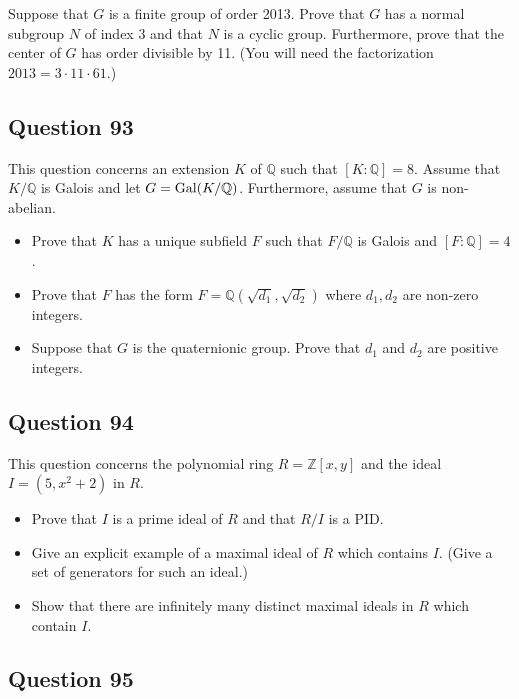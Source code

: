 \documentclass[12pt]{article}
\begin{document}
Suppose that \(G\) is a finite group of order 2013. Prove that \(G\) has
a normal subgroup \(N\) of index 3 and that \(N\) is a cyclic group.
Furthermore, prove that the center of \(G\) has order divisible by 11.
(You will need the factorization \(2013=3\cdot11\cdot61\).)

\hypertarget{question-93}{%
\subsection{Question 93}\label{question-93}}

This question concerns an extension \(K\) of \(\mathbb Q\) such that
\([K:\mathbb Q]=8\). Assume that \(K/\mathbb Q\) is Galois and let
\(G=\mathrm{Gal}(K/\mathbb Q)\). Furthermore, assume that \(G\) is non-abelian.

\begin{itemize}
\item
  Prove that \(K\) has a unique subfield \(F\) such that \(F/\mathbb Q\)
  is Galois and \([F:\mathbb Q]=4\).
\item
  Prove that \(F\) has the form \(F=\mathbb Q(\sqrt{d_1},\sqrt{d_2})\)
  where \(d_1,d_2\) are non-zero integers.
\item
  Suppose that \(G\) is the quaternionic group. Prove that \(d_1\) and
  \(d_2\) are positive integers.
\end{itemize}

\hypertarget{question-94}{%
\subsection{Question 94}\label{question-94}}

This question concerns the polynomial ring \(R=\mathbb Z[x,y]\) and the
ideal \(I=(5,x^2+2)\) in \(R\).

\begin{itemize}
\item
  Prove that \(I\) is a prime ideal of \(R\) and that \(R/I\) is a PID.
\item
  Give an explicit example of a maximal ideal of \(R\) which contains
  \(I\). (Give a set of generators for such an ideal.)
\item
  Show that there are infinitely many distinct maximal ideals in \(R\)
  which contain \(I\).
\end{itemize}

\hypertarget{question-95}{%
\subsection{Question 95}\label{question-95}}
\end{document}
